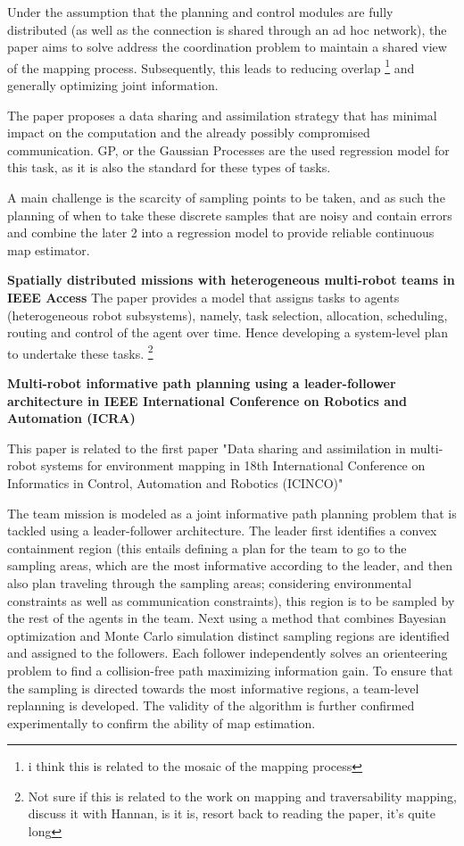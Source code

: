 \documentclass{article}
\begin{document}
Under the assumption that the planning and control modules are fully distributed (as well as the connection is shared through an ad hoc network), the paper aims to solve address the coordination problem to maintain a shared view of the mapping process. Subsequently, this leads to reducing overlap \footnote{i think this is related to the mosaic of the mapping process} and generally optimizing joint information. 

The paper proposes a data sharing and assimilation strategy that has minimal impact on the computation and the already possibly compromised communication. GP, or the Gaussian Processes are the used regression model for this task, as it is also the standard for these types of tasks. 

A main challenge is the scarcity of sampling points to be taken, and as such the planning of when to take these discrete samples that are noisy and contain errors and combine the later 2 into a regression model to provide reliable continuous map estimator. 

\vspace{5pt}

\textbf{Spatially distributed missions with heterogeneous multi-robot teams in IEEE Access}
The paper provides a model that assigns tasks to agents (heterogeneous robot subsystems), namely, task selection, allocation, scheduling, routing and control of the agent over time. Hence developing a system-level plan to undertake these tasks. \footnote{Not sure if this is related to the work on mapping and traversability mapping, discuss it with Hannan, is it is, resort back to reading the paper, it's quite long}

\textbf{Multi-robot informative path planning using a leader-follower architecture in IEEE International Conference on Robotics and Automation (ICRA)}

This paper is related to the first paper "Data sharing and assimilation in multi-robot systems for environment mapping in 18th International Conference on Informatics in Control, Automation and Robotics (ICINCO)"

The team mission is modeled as a joint informative path planning problem that is tackled using a leader-follower architecture. The leader first identifies a convex containment region (this entails defining a plan for the team to go to the sampling areas, which are the most informative according to the leader, and then also plan traveling through the sampling areas; considering environmental constraints as well as communication constraints), this region is to be sampled by the rest of the agents in the team. Next using a method that combines Bayesian optimization and Monte Carlo simulation distinct sampling regions are identified and assigned to the followers. Each follower independently solves an orienteering problem to find a collision-free path maximizing information gain. To ensure that the sampling is directed towards the most informative regions, a team-level replanning is developed. 
The validity of the algorithm is further confirmed experimentally to confirm the ability of map estimation. 
\end{document}
